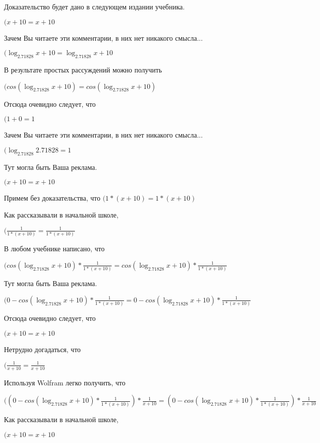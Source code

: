 \documentclass[12pt,a4paper,fleqn]{article}
\theoremstyle{definition}
\begin{document}
Доказательство будет дано в следующем издании учебника.

$( x  +  10  =  x  +  10 $

Зачем Вы читаете эти комментарии, в них нет никакого смысла...

$(\log_{ 2.71828 }{ x  +  10 } = \log_{ 2.71828 }{ x  +  10 }$

В результате простых рассуждений можно получить

$(cos(\log_{ 2.71828 }{ x  +  10 }) = cos(\log_{ 2.71828 }{ x  +  10 })$

Отсюда очевидно следует, что

$( 1  +  0  =  1 $

Зачем Вы читаете эти комментарии, в них нет никакого смысла...

$(\log_{ 2.71828 }{ 2.71828 } =  1 $

Тут могла быть Ваша реклама.

$( x  +  10  =  x  +  10 $

Примем без доказательства, что
$( 1  * ( x  +  10 ) =  1  * ( x  +  10 )$

Как рассказывали в начальной школе,

$(\frac{ 1 }{ 1  * ( x  +  10 )}
 = \frac{ 1 }{ 1  * ( x  +  10 )}
$

В любом учебнике написано, что

$(cos(\log_{ 2.71828 }{ x  +  10 }) * \frac{ 1 }{ 1  * ( x  +  10 )}
 = cos(\log_{ 2.71828 }{ x  +  10 }) * \frac{ 1 }{ 1  * ( x  +  10 )}
$

Тут могла быть Ваша реклама.

$( 0  - cos(\log_{ 2.71828 }{ x  +  10 }) * \frac{ 1 }{ 1  * ( x  +  10 )}
 =  0  - cos(\log_{ 2.71828 }{ x  +  10 }) * \frac{ 1 }{ 1  * ( x  +  10 )}
$

Отсюда очевидно следует, что

$( x  +  10  =  x  +  10 $

Нетрудно догадаться, что

$(\frac{ 1 }{ x  +  10 }
 = \frac{ 1 }{ x  +  10 }
$

Используя Wolfram легко получить, что

$(( 0  - cos(\log_{ 2.71828 }{ x  +  10 }) * \frac{ 1 }{ 1  * ( x  +  10 )}
) * \frac{ 1 }{ x  +  10 }
 = ( 0  - cos(\log_{ 2.71828 }{ x  +  10 }) * \frac{ 1 }{ 1  * ( x  +  10 )}
) * \frac{ 1 }{ x  +  10 }
$

Как рассказывали в начальной школе,

$( x  +  10  =  x  +  10 $
\end{document}
